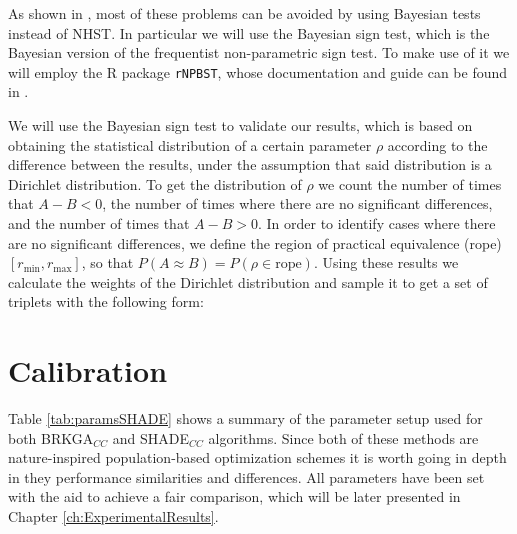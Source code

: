 As shown in \cite{benavoli2017time}, most of these problems can be avoided by using Bayesian tests instead of NHST. In particular we will use the Bayesian sign test, which is the Bayesian version of the frequentist non-parametric sign test. To make use of it we will employ the R package \texttt{rNPBST}, whose documentation and guide can be found in \cite{carrasco2017rnpbst}.

We will use the Bayesian sign test to validate our results, which is based on obtaining the statistical distribution of a certain parameter $\rho$ according to the difference between the results, under the assumption that said distribution is a Dirichlet distribution. To get the distribution of $\rho$ we count the number of times that $A - B < 0$, the number of times where there are no significant differences, and the number of times that $A - B > 0$. In order to identify cases where there are no significant differences, we define the region of practical equivalence (rope) $[r_\text{min}, r_\text{max}]$, so that $P(A \approx B) = P(\rho \in \text{rope})$. Using these results we calculate the weights of the Dirichlet distribution and sample it to get a set of triplets with the following form: \\

\noindent\resizebox{\textwidth}{!}{$[P(\rho < r_\text{min}) = P(A - B < 0),\;\; P(\rho \in \text{rope}),\;\; P(\rho > r_\text{max}) = P(A - B > 0)]$}

\section{Calibration}

Table \ref{tab:paramsSHADE} shows a summary of the parameter setup used for both \acs{BRKGA}$_{CC}$ and \acs{SHADE}$_{CC}$ algorithms. Since both of these methods are nature-inspired population-based optimization schemes it is worth going in depth in they performance similarities and differences. All parameters have been set with the aid to achieve a fair comparison, which will be later presented in Chapter \ref{ch:ExperimentalResults}.

